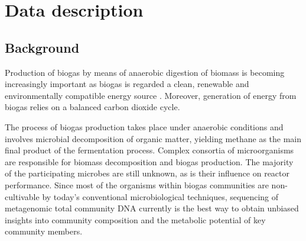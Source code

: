 \documentclass{bmcart}
\begin{document}


\section*{Data description}

\subsection*{Background}
Production of biogas by means of anaerobic digestion of biomass is becoming increasingly important as biogas is regarded a clean, renewable and environmentally compatible energy source \cite{Weiland2010}. Moreover, generation of energy from biogas relies on a balanced carbon dioxide cycle.

The process of biogas production takes place under anaerobic conditions and involves microbial decomposition of organic matter, yielding methane as the main final product of the fermentation process. Complex consortia of microorganisms are responsible for biomass decomposition and biogas production.
The majority of the participating microbes are still unknown, as is their influence on reactor performance. Since most of the organisms within biogas communities are non-cultivable by today’s conventional microbiological techniques, sequencing of metagenomic total community DNA currently is the best way to obtain unbiased insights into community composition and the metabolic potential of key community members.
\end{document}
